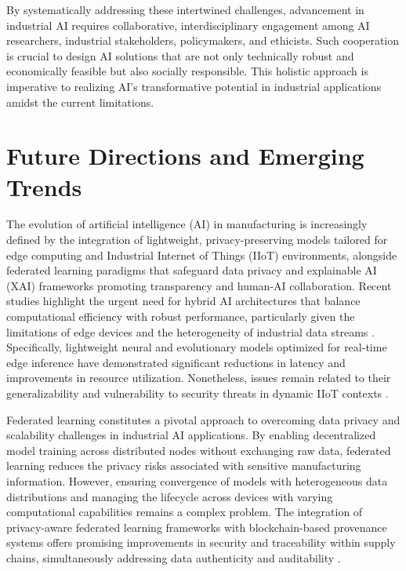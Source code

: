 \documentclass[11pt]{article}
\begin{document}
\vspace{1em}
By systematically addressing these intertwined challenges, advancement in industrial AI requires collaborative, interdisciplinary engagement among AI researchers, industrial stakeholders, policymakers, and ethicists. Such cooperation is crucial to design AI solutions that are not only technically robust and economically feasible but also socially responsible. This holistic approach is imperative to realizing AI’s transformative potential in industrial applications amidst the current limitations.


\section{Future Directions and Emerging Trends}

The evolution of artificial intelligence (AI) in manufacturing is increasingly defined by the integration of lightweight, privacy-preserving models tailored for edge computing and Industrial Internet of Things (IIoT) environments, alongside federated learning paradigms that safeguard data privacy and explainable AI (XAI) frameworks promoting transparency and human-AI collaboration. Recent studies highlight the urgent need for hybrid AI architectures that balance computational efficiency with robust performance, particularly given the limitations of edge devices and the heterogeneity of industrial data streams \cite{ref5,ref30}. Specifically, lightweight neural and evolutionary models optimized for real-time edge inference have demonstrated significant reductions in latency and improvements in resource utilization. Nonetheless, issues remain related to their generalizability and vulnerability to security threats in dynamic IIoT contexts \cite{ref31}.

Federated learning constitutes a pivotal approach to overcoming data privacy and scalability challenges in industrial AI applications. By enabling decentralized model training across distributed nodes without exchanging raw data, federated learning reduces the privacy risks associated with sensitive manufacturing information. However, ensuring convergence of models with heterogeneous data distributions and managing the lifecycle across devices with varying computational capabilities remains a complex problem. The integration of privacy-aware federated learning frameworks with blockchain-based provenance systems offers promising improvements in security and traceability within supply chains, simultaneously addressing data authenticity and auditability \cite{ref6,ref25,ref41}.
\end{document}
